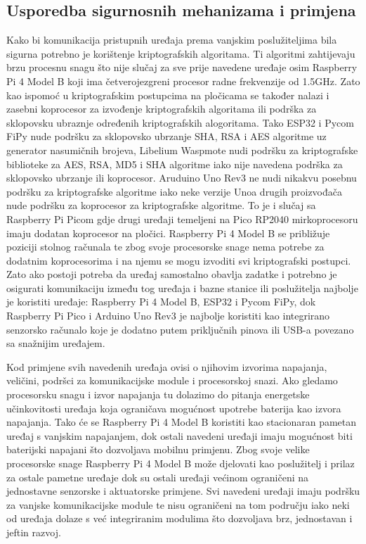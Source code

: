 \documentclass[times, utf8, diplomski]{fer}
\begin{document}
\subsection{Usporedba sigurnosnih mehanizama i primjena}
Kako bi komunikacija pristupnih uređaja prema vanjskim poslužiteljima bila sigurna potrebno je korištenje kriptografskih algoritama. Ti algoritmi zahtijevaju brzu procesnu snagu što nije slučaj za sve prije navedene uređaje osim Raspberry Pi 4 Model B koji ima četverojezgreni procesor radne frekvenzije od 1.5GHz. Zato kao ispomoć u kriptografskim postupcima na pločicama se također nalazi i zasebni koprocesor za izvođenje kriptografskih algoritama ili podrška za sklopovsku ubraznje određenih kriptografskih alogoritama. Tako ESP32 i Pycom FiPy nude podršku za sklopovsko ubrzanje SHA, RSA i AES algoritme uz generator nasumičnih brojeva, Libelium Waspmote nudi podršku za kriptografske biblioteke za AES, RSA, MD5 i SHA algoritme iako nije navedena podrška za sklopovsko ubrzanje ili koprocesor. Aruduino Uno Rev3 ne nudi nikakvu posebnu podršku za kriptografske algoritme iako neke verzije Unoa drugih proizvođača nude podršku za koprocesor za kriptografske algoritme. To je i slučaj sa Raspberry Pi Picom gdje drugi uređaji temeljeni na Pico RP2040 mirkoprocesoru imaju dodatan koprocesor na pločici. Raspberry Pi 4 Model B se približuje poziciji stolnog računala te zbog svoje procesorske snage nema potrebe za dodatnim koprocesorima i na njemu se mogu izvoditi svi kriptografski postupci. Zato ako postoji potreba da uređaj samostalno obavlja zadatke i potrebno je osigurati komunikaciju između tog uređaja i bazne stanice ili poslužitelja najbolje je koristiti uređaje: Raspberry Pi 4 Model B, ESP32 i Pycom FiPy, dok Raspberry Pi Pico i Arduino Uno Rev3 je najbolje koristiti kao integrirano senzorsko računalo koje je dodatno putem priključnih pinova ili USB-a povezano sa snažnijim uređajem.

Kod primjene svih navedenih uređaja ovisi o njihovim izvorima napajanja, veličini, podršci za komunikacijske module i procesorskoj snazi. Ako gledamo procesorsku snagu i izvor napajanja tu dolazimo do pitanja energetske učinkovitosti uređaja koja ograničava mogućnost upotrebe baterija kao izvora napajanja. Tako će se Raspberry Pi 4 Model B koristiti kao stacionaran pametan uređaj s vanjskim napajanjem, dok ostali navedeni uređaji imaju mogućnost biti baterijski napajani što dozvoljava mobilnu primjenu. Zbog svoje velike procesorske snage Raspberry Pi 4 Model B može djelovati kao poslužitelj i prilaz za ostale pametne uređaje dok su ostali uređaji većinom ograničeni na jednostavne senzorske i aktuatorske primjene. Svi navedeni uređaji imaju podršku za vanjske komunikacijske module te nisu ograničeni na tom području iako neki od uređaja dolaze s već integriranim modulima što dozvoljava brz, jednostavan i jeftin razvoj.
\end{document}
